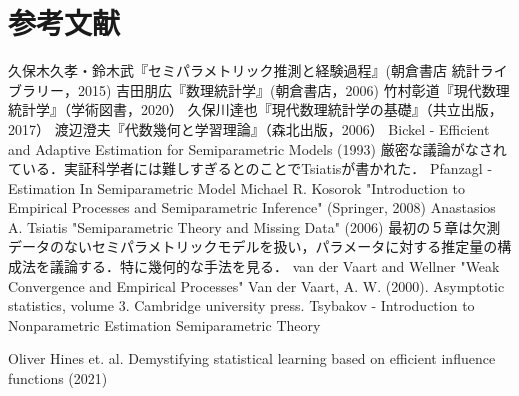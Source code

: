 \documentclass[uplatex,dvipdfmx]{jsreport}
\begin{document}
\chapter{参考文献}

\begin{thebibliography}{99}
    久保木久孝・鈴木武『セミパラメトリック推測と経験過程』(朝倉書店 統計ライブラリー，2015)
    吉田朋広『数理統計学』(朝倉書店，2006)
    竹村彰道『現代数理統計学』（学術図書，2020）
    久保川達也『現代数理統計学の基礎』（共立出版，2017）
    渡辺澄夫『代数幾何と学習理論』（森北出版，2006）
    Bickel - Efficient and Adaptive Estimation for Semiparametric Models (1993)
    厳密な議論がなされている．実証科学者には難しすぎるとのことでTsiatisが書かれた．
    Pfanzagl - Estimation In Semiparametric Model
    Michael R. Kosorok "Introduction to Empirical Processes and Semiparametric Inference" (Springer, 2008)
    Anastasios A. Tsiatis "Semiparametric Theory and Missing Data" (2006)
    最初の５章は欠測データのないセミパラメトリックモデルを扱い，パラメータに対する推定量の構成法を議論する．特に幾何的な手法を見る．
    van der Vaart and Wellner "Weak Convergence and Empirical Processes"
    Van der Vaart, A. W. (2000). Asymptotic statistics, volume 3. Cambridge university press.
    Tsybakov - Introduction to Nonparametric Estimation
    Semiparametric Theory

    Oliver Hines et. al. Demystifying statistical learning based on
    efficient influence functions (2021)
\end{thebibliography}
\end{document}
